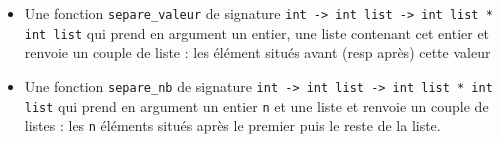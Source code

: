 \documentclass[11pt,a4paper]{article}
\begin{document}
\begin{Exercise}[title = {Parcours d'arbre binaires}]
{		\begin{itemize}
			\item Une fonction {\tt separe\_valeur} de signature {\tt int -> int list -> int list * int list} qui prend en argument un entier, une liste contenant cet entier et renvoie un couple de liste : les élément situés avant (resp après) cette valeur
			\item Une fonction {\tt separe\_nb} de signature {\tt int -> int list -> int list * int list} qui prend en argument un entier {\tt n} et une liste et renvoie un couple de listes : les {\tt n} éléments situés après le premier puis le reste de la liste.
		\end{itemize}
	}

\end{Exercise}
\end{document}

